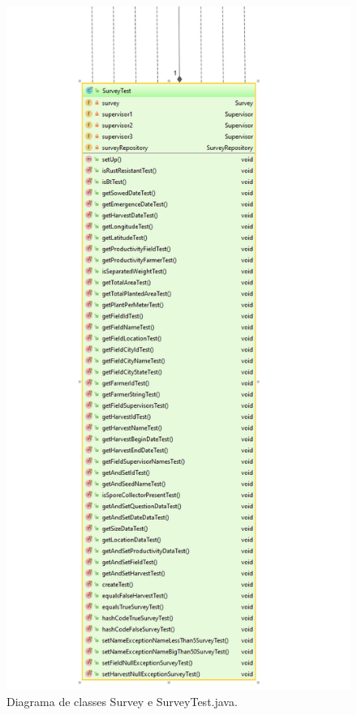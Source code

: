\begin{figure}[H]
	\centering
	\includegraphics[scale=0.7]{dados/figuras/surveyTest.png}
	\caption{Diagrama de classes Survey e SurveyTest.java.}
	\label{classesSurvey}
\end{figure}

